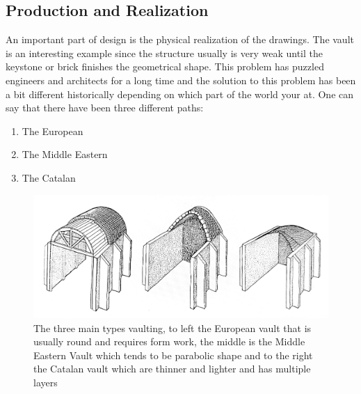 \subsection{Production and Realization}

An important part of design is the physical realization of the drawings. The vault is an interesting example since the structure usually is very weak until the keystone or brick finishes the geometrical shape. This problem has puzzled engineers and architects for a long time and the solution to this problem has been a bit different historically depending on which part of the world your at. One can say that there have been three different paths: \cite{ref:Dieste}

\begin{enumerate}
    \item The European
    \item The Middle Eastern
    \item The Catalan
\end{enumerate}


\begin{figure}[H]
\centering
\includegraphics[width=0.9\linewidth ]{figure/Introduction/vaulting2.pdf}
\caption{The three main types vaulting, to left the European vault that is usually round and requires form work, the middle is the Middle Eastern Vault which tends to be parabolic shape and to the right the Catalan vault which are thinner and lighter and has multiple layers \cite{ref:Ochsendorf}}
\label{fig:vaults}
\end{figure}


